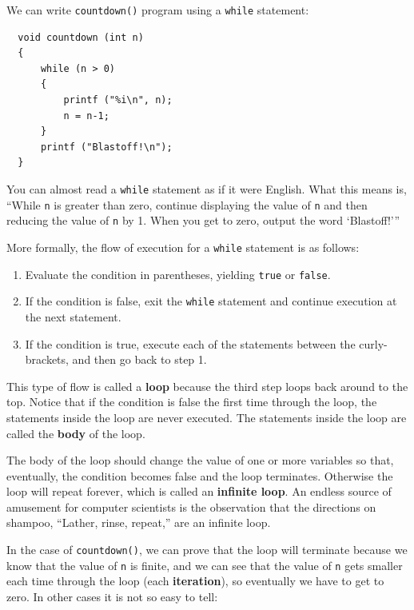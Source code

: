 We can write {\tt countdown()} program using a {\tt while} statement:

\begin{verbatim}
  void countdown (int n) 
  {
      while (n > 0) 
      {
          printf ("%i\n", n);
          n = n-1;
      }
      printf ("Blastoff!\n");
  }
\end{verbatim}
%
You can almost read a {\tt while} statement as if it were
English.  What this means is, ``While {\tt n} is greater than
zero, continue displaying the value of {\tt n} and then reducing
the value of {\tt n} by 1.  When you get to zero, output the
word `Blastoff!'''

More formally, the flow of execution for a {\tt while} statement
is as follows:

 \begin{enumerate}
 	
 	\item Evaluate the condition in parentheses, yielding {\tt true}
or {\tt false}.

\item If the condition is false, exit the {\tt while} statement
and continue execution at the next statement.

\item If the condition is true, execute each of the statements
between the curly-brackets, and then go back to step 1.

\end{enumerate}

This type of flow is called a {\bf loop} because the third step loops
back around to the top.  Notice that if the condition is false the
first time through the loop, the statements inside the loop are
never executed.  The statements inside the loop are called
the {\bf body} of the loop.


The body of the loop should change the value of
one or more variables so that, eventually, the condition becomes
false and the loop terminates.  Otherwise the loop will repeat
forever, which is called an {\bf infinite loop}.  An endless
source of amusement for computer scientists is the observation
that the directions on shampoo, ``Lather, rinse, repeat,'' are
an infinite loop.

In the case of {\tt countdown()}, we can prove that the loop
will terminate because we know that the value of {\tt n} is
finite, and we can see that the value of {\tt n} gets smaller
each time through the loop (each {\bf iteration}), so
eventually we have to get to zero.  In other cases it is not
so easy to tell:

